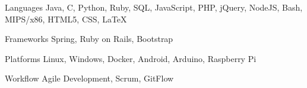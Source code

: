 
\vspace{0mm}
\begin{cvskills}

  \vspace{1mm}

  \cvskill
    {Languages} %
    {Java, C, Python, Ruby, SQL, JavaScript, PHP, jQuery, NodeJS, Bash, MIPS/x86, HTML5, CSS, LaTeX} %

  \vspace{1mm}

  \cvskill
    {Frameworks} %
    {Spring, Ruby on Rails, Bootstrap} %

  \vspace{1mm}

  \cvskill
    {Platforms} %
    {Linux, Windows, Docker, Android, Arduino, Raspberry Pi} %

  \vspace{1mm}

  \cvskill
    {Workflow} %
    {Agile Development, Scrum, GitFlow} %

\end{cvskills}
